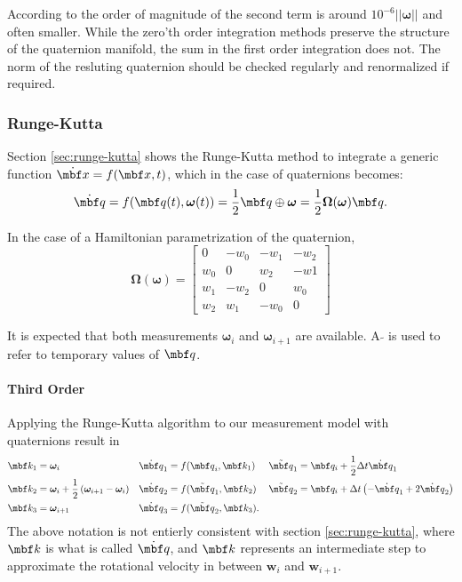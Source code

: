 \documentclass[10pt,a4paper]{article}
\newcommand{\mbs}[1]{{\boldsymbol{#1}}}
\numberwithin{equation}{section}
\begin{document}
According to \cite{joan_sola} the order of magnitude of the second term is around $10^{-6} ||\bm \omega ||$ and often smaller.
While the zero'th order integration methods preserve the structure of the quaternion manifold, the sum in the first order integration does not.
The norm of the resluting quaternion should be checked regularly and renormalized if required.

\subsubsection{Runge-Kutta}
Section \ref{sec:runge-kutta} shows the Runge-Kutta method to integrate a generic function $\dot{\mbf x} = f(\mbf x, t)$, which in the case of quaternions becomes:
\begin{equation}
\dot{\mbf q} = f(\mbf q(t), \mbs \omega(t)) = \dfrac{1}{2} \mbf q \oplus \mbs \omega = \dfrac{1}{2} \mbs \Omega(\mbs \omega) {\mbf q}.
\end{equation}

In the case of a Hamiltonian parametrization of the quaternion,
\begin{equation}
\mbs \Omega(\mbs \omega) = \begin{bmatrix}
0 & -w_0 & -w_1 & -w_2 \\
w_0 & 0 & w_2 & -w1 \\
w_1 & -w_2 & 0 & w_0 \\
w_2 & w_1 & -w_0 & 0
\end{bmatrix}
\end{equation}

It is expected that both measurements $\mbs \omega_i$ and $\mbs \omega_{i+1}$ are available. A $\tilde{}$ is used to refer to temporary values of $\mbf q$.

\paragraph{Third Order}
Applying the Runge-Kutta algorithm to our measurement model with quaternions result in
\begin{align*}
\mbf k_1 &= \mbs \omega_i &
\dot{\mbf q}_1 &= f({\mbf q}_i , \mbf k_1) &
\tilde{\mbf q}_1 &= \mbf q_i +\dfrac{1}{2} \Delta t \dot{\mbf q}_1 \\
\mbf k_2 &= \mbs \omega_i + \dfrac{1}{2}\left( \mbs \omega_{i+1} - \mbs \omega_i \right) &
\dot{\mbf q}_2 &= f(\tilde{\mbf q}_1 , \mbf k_2) &
\tilde{\mbf q}_2 &= \mbf q_i + \Delta t \left(-\dot{\mbf q}_1 + 2 \dot{\mbf q}_2 \right) \\
\mbf k_3  &=  \mbs \omega_{i+1} &
\dot{\mbf q}_3 &= f(\tilde{\mbf q}_2 , \mbf k_3). &
\end{align*}
The above notation is not entierly consistent with section \ref{sec:runge-kutta}, where $\mbf k$ is what is called $\dot{\mbf q}$, and $\mbf k$ represents an intermediate step to approximate the rotational velocity in between $\mbs w_i$ and $\mbs w_{i+1}$.
\end{document}
